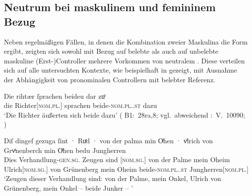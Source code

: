 \subsection{Neutrum bei maskulinem und femininem Bezug}
\label{subsec:m+m_anim_beidiu}

Neben regelmäßigen Fällen, in denen die Kombination zweier Maskulina die Form
 ergibt, zeigten sich sowohl mit Bezug auf belebte als auch auf
unbelebte maskuline (Erst-)Controller mehrere Vorkommen von neutralem
. Diese verteilen sich auf alle untersuchten Kontexte, wie
beispielhaft in  gezeigt, mit Ausnahme der Abhängigkeit von
pronominalen Controllern mit belebter Referenz.

\begin{exe}
\ex \label{ex:m+m_beidiu}
	\begin{xlist}
	\ex \label{ex:m+m_beidiu_1}
		\gll Die rihtær ſprachen beideu {dar zuͦ} \\
			die Richter[\textsc{nom.pl.\MascM}] sprachen
			beide-\textsc{nom.pl.\NeutM.st} dazu \\
		\trans `Die Richter äußerten sich beide dazu'
			(%
				B1:~28ra,8; vgl.~abweichend
				\KC:~V.~10090;
				\cite[267]{schroeder1895}%
			)

	\ex \label{ex:m+m_beidiu_3}
		\gll Diſ dingeſ gezuga ſint · Ruͦd · von der palma min Oͤhen · vͦlrich
				von Grvͤnenberch min Oͤhen bedu Jungherren \textelp{} \\
			Dies Verhandlung-\textsc{gen.sg.\NeutI} Zeugen sind {}
				[\textsc{nom.sg.\MascM}] {} von der Palme mein Oheim
				{} Ulrich[\textsc{nom.sg.\MascM}] von Grünenberg mein Oheim
				beide-\textsc{nom.pl.\NeutM.st}
				Jungherren[\textsc{nom.pl.\MascM}] {} \\
		\trans `Zeugen dieser Verhandlung sind:  von der Palme,
			mein Onkel, Ulrich von Grünenberg, mein Onkel -- beide Junker --
			\textelp{}'
			\parencites(Nr.~2915, Kl.~St.~Urban, Kt.~Luzern, 1298)[213,33--35]{cao4}



\end{xlist}
\end{exe}
